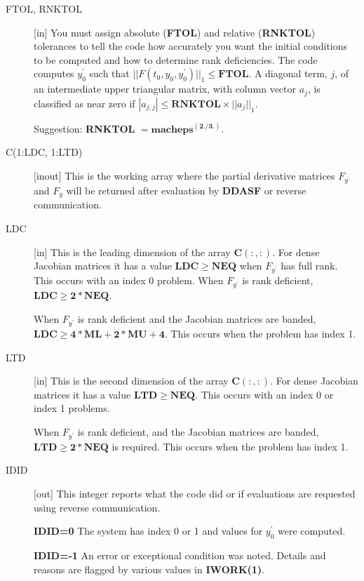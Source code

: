 \documentclass[twoside]{MATH77}
\begin{document}
\begin{description}
   \item[FTOL, RNKTOL][in] You must assign absolute (\textbf{FTOL})
     and relative (\textbf{RNKTOL}) tolerances to tell the code how
     accurately you want the initial conditions to be computed and how
     to determine rank deficiencies.  The code computes $y^{\prime}_0$
     such that $||F(t_0,y_0,y^{\prime}_0)||_1 \leq \mathbf{FTOL}$.  A
     diagonal term, $j$, of an intermediate upper triangular matrix,
     with column vector $a_j$, is classified as near zero if
     $|a_{j,j}| \leq \mathbf{RNKTOL} \times ||a_j||_1$.

  Suggestion: \textbf{RNKTOL} $= \mathbf{macheps^{(2./3.)}}$.
  
\item[C(1:LDC, 1:LTD)][inout] This is the working array where the partial
     derivative matrices $F_{y^{\prime}}$ and $F_y$ will be returned after
     evaluation by \textbf{DDASF} or reverse communication.

\item[LDC][in] 
 This is the leading dimension of the array $\mathbf{C(:,:)}$.  
For dense Jacobian matrices it has
 a value $\mathbf{LDC \geq NEQ}$ when $F_{y^{\prime}}$ has full rank.  This occurs with
  an index 0 problem.  When $F_{y^{\prime}}$ is rank deficient, 
  $\mathbf{LDC \geq 2*NEQ}$.

  When $F_{y^{\prime}}$ is rank deficient and the Jacobian matrices are banded,  $\mathbf{LDC \geq 4*ML+2*MU+4}$.
    This occurs when the problem has index 1.

\item[LTD][in] 
This is the second dimension of the array $\mathbf{C(:,:)}$.
For dense Jacobian matrices it has
 a value $\mathbf{LTD \geq NEQ}$.
   This occurs with
     an index 0  or index 1 problems.

  When $F_{y^{\prime}}$ is rank deficient,
 and the Jacobian matrices are banded,  $\mathbf{LTD \geq 2*NEQ}$
  is required.  This occurs when the problem has index 1.


\item[IDID] [out] This integer reports what the code did or
 if evaluations are requested using reverse communication. 

\textbf{IDID=0} The system has index 0 or 1 and values for $y^{\prime}_0$ were computed.

\textbf{IDID=-1} An error or exceptional condition was noted.  Details and reasons are
      flagged by various values in \textbf{IWORK(1)}.\pageref{EXCS}


\end{description}
\end{document}
